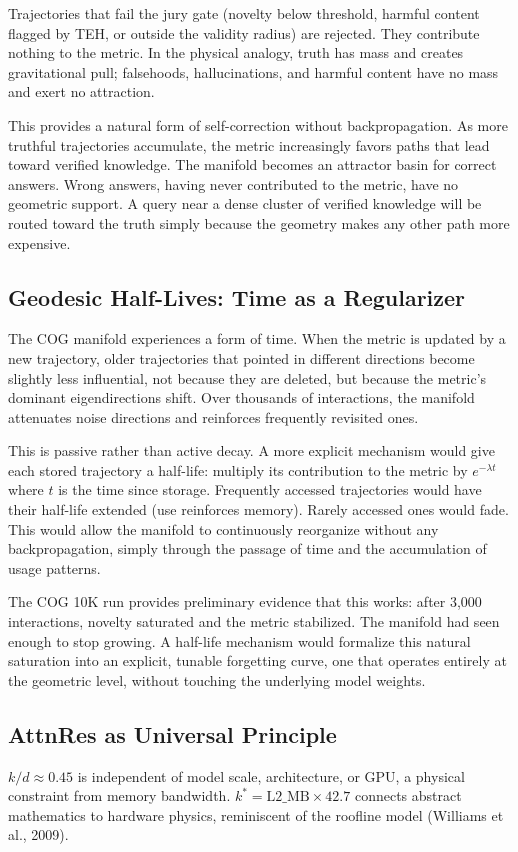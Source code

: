 \documentclass[11pt]{article}
\begin{document}
Trajectories that fail the jury gate (novelty below threshold, harmful
content flagged by TEH, or outside the validity radius) are rejected. They
contribute nothing to the metric. In the physical analogy, truth has mass and
creates gravitational pull; falsehoods, hallucinations, and harmful content
have no mass and exert no attraction.

This provides a natural form of self-correction without backpropagation. As
more truthful trajectories accumulate, the metric increasingly favors paths
that lead toward verified knowledge. The manifold becomes an attractor basin
for correct answers. Wrong answers, having never contributed to the metric,
have no geometric support. A query near a dense cluster of verified knowledge
will be routed toward the truth simply because the geometry makes any other
path more expensive.

\subsection{Geodesic Half-Lives: Time as a Regularizer}

The COG manifold experiences a form of time. When the metric is updated by a
new trajectory, older trajectories that pointed in different directions become
slightly less influential, not because they are deleted, but because the
metric's dominant eigendirections shift. Over thousands of interactions, the
manifold attenuates noise directions and reinforces frequently revisited ones.

This is passive rather than active decay. A more explicit mechanism would
give each stored trajectory a half-life: multiply its contribution to the
metric by $e^{-\lambda t}$ where $t$ is the time since storage. Frequently
accessed trajectories would have their half-life extended (use reinforces
memory). Rarely accessed ones would fade. This would allow the manifold to
continuously reorganize without any backpropagation, simply through the
passage of time and the accumulation of usage patterns.

The COG 10K run provides preliminary evidence that this works: after 3,000
interactions, novelty saturated and the metric stabilized. The manifold had
seen enough to stop growing. A half-life mechanism would formalize this
natural saturation into an explicit, tunable forgetting curve, one that
operates entirely at the geometric level, without touching the underlying
model weights.

\subsection{AttnRes as Universal Principle}
$k/d \approx 0.45$ is independent of model scale, architecture, or GPU, a physical constraint from memory bandwidth. $k^* = \mathrm{L2\_MB} \times 42.7$ connects abstract mathematics to hardware physics, reminiscent of the roofline model (Williams et al., 2009).
\end{document}
